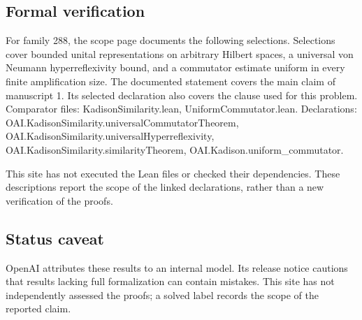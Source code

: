 \documentclass[11pt]{article}
\begin{document}
\subsection{Formal verification}
For family 288, the scope page documents the following selections. Selections cover bounded unital representations on arbitrary Hilbert spaces, a universal von Neumann hyperreflexivity bound, and a commutator estimate uniform in every finite amplification size. The documented statement covers the main claim of manuscript 1. Its selected declaration also covers the clause used for this problem. Comparator files: KadisonSimilarity.lean, UniformCommutator.lean. Declarations: OAI.KadisonSimilarity.universalCommutatorTheorem, OAI.KadisonSimilarity.universalHyperreflexivity, OAI.KadisonSimilarity.similarityTheorem, OAI.Kadison.uniform\_commutator.

This site has not executed the Lean files or checked their dependencies. These descriptions report the scope of the linked declarations, rather than a new verification of the proofs.

\subsection{Status caveat}
OpenAI attributes these results to an internal model. Its release notice cautions that results lacking full formalization can contain mistakes. This site has not independently assessed the proofs; a solved label records the scope of the reported claim.
\end{document}
